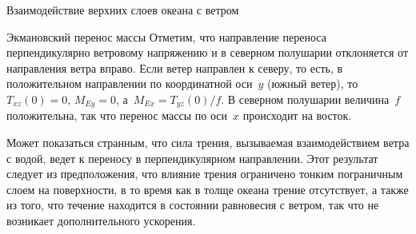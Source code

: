 \begin{chapter}{Взаимодействие верхних слоев океана с ветром}
\begin{section}{Экмановский перенос массы}
Отметим, что направление переноса перпендикулярно ветровому 
напряжению и в северном 
полушарии отклоняется от направления ветра вправо. Если ветер направлен к 
северу, то есть, в положительном направлении по координатной оси~$y$ 
(южный ветер), то~$T_{xz}(0) = 0$, $M_{Ey} = 0$, а~$M_{Ex} = T_{yz}(0)/f$. 
В северном полушарии величина~$f$ положительна, так что перенос массы 
по оси~$x$ происходит на восток.
%

Может показаться странным, что сила трения, вызываемая взаимодействием ветра
с водой, ведет к переносу в перпендикулярном направлении. Этот результат
следует из предположения, что влияние трения ограничено тонким пограничным
слоем на поверхности, в то время как в толще океана трение отсутствует,
а также из того, что течение находится в состоянии равновесия с ветром, так
что не возникает дополнительного ускорения.
%


\end{section}
\end{chapter}

